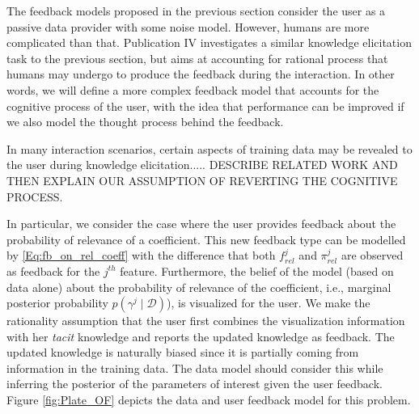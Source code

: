 \documentclass[dissertation,math,vertlayout,pdfa,colorlinks]{aaltoseries}
\newcommand{\bD}{\mathcal{D}}
\begin{document}
The feedback models proposed in the previous section consider the user as a passive data provider with some noise model. However, humans are more complicated than that. Publication IV investigates a similar knowledge elicitation task to the previous section, but aims at accounting for rational process that humans may undergo to produce the feedback during the interaction. In other words, we will define a more complex feedback model that accounts for the cognitive process of the user, with the idea that performance can be improved if we also model the thought process behind the feedback.

In many interaction scenarios, certain aspects of training data may be revealed to the user during knowledge elicitation..... DESCRIBE RELATED WORK AND THEN EXPLAIN OUR ASSUMPTION OF REVERTING THE COGNITIVE PROCESS.

In particular, we consider the case where the user provides feedback about the probability of relevance of a coefficient. This new feedback type can be modelled by \ref{Eq:fb_on_rel_coeff} with the difference that both $f_{rel}^{j}$ and $\pi_{rel}^{j}$ are observed as feedback for the $j^{th}$ feature. Furthermore, the belief of the model (based on data alone) about the probability of relevance of the coefficient, i.e., marginal posterior probability $p(\gamma^j \mid \bD)$), is visualized for the user. We make the rationality assumption that the user first combines the visualization information with her \textit{tacit} knowledge and reports the updated knowledge as feedback. The updated knowledge is naturally biased since it is partially coming from information in the training data. The data model should consider this while inferring the posterior of the parameters of interest given the user feedback. Figure \ref{fig:Plate_OF} depicts the data and user feedback model for this problem.
 
\end{document}
